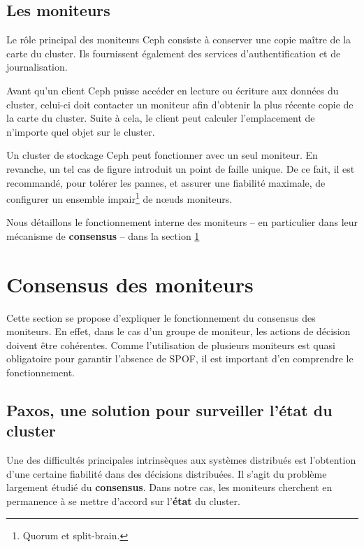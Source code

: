 \subsection{Les moniteurs}

\begin{PimpedBox}
Le rôle principal des moniteurs Ceph consiste à conserver une copie maître de la carte du cluster. Ils fournissent également des services d'authentification et de journalisation.
\end{PimpedBox}

Avant qu'un client Ceph puisse accéder en lecture ou écriture aux données du cluster, celui-ci doit contacter un moniteur afin d'obtenir la plus récente copie de la carte du cluster. Suite à cela, le client peut calculer l'emplacement de n'importe quel objet sur le cluster.

Un cluster de stockage Ceph peut fonctionner avec un seul moniteur. En revanche, un tel cas de figure introduit un point de faille unique. De ce fait, il est recommandé, pour tolérer les pannes, et assurer une fiabilité maximale, de configurer un ensemble impair\footnote{Quorum et split-brain.} de nœuds moniteurs. 

Nous détaillons le fonctionnement interne des moniteurs -- en particulier dans leur mécanisme de \textbf{consensus} -- dans la section \ref{chap2:sec3}

\section{Consensus des moniteurs}
\label{chap2:sec3}

Cette section se propose d'expliquer le fonctionnement du consensus des moniteurs. En effet, dans le cas d'un groupe de moniteur, les actions de décision doivent être cohérentes. Comme l'utilisation de plusieurs moniteurs est quasi obligatoire pour garantir l'absence de SPOF, il est important d'en comprendre le fonctionnement.

\subsection{Paxos, une solution pour surveiller l'état du cluster}

Une des difficultés principales intrinsèques aux systèmes distribués est l'obtention d'une certaine fiabilité dans des décisions distribuées. Il s'agit du problème largement étudié du \textbf{consensus}. Dans notre cas, les moniteurs cherchent en permanence à se mettre d'accord sur l'\textbf{état} du cluster.

